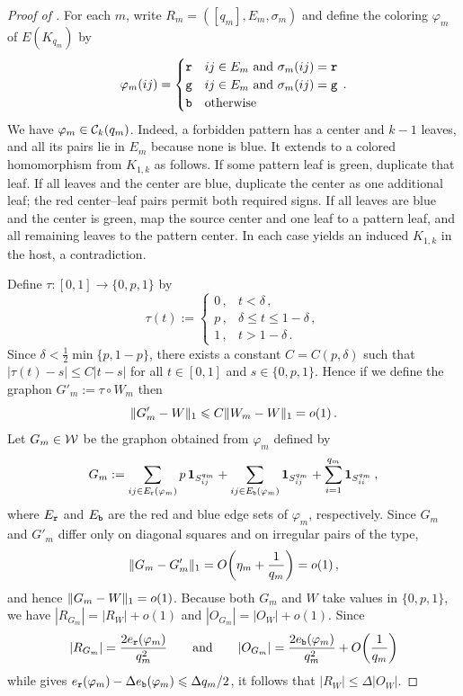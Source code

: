 \begin{proof}[Proof of ]
For each $m$, write $R_m=([q_m],E_m,\sigma_m)$ and define the coloring $\varphi_m$ of $E(K_{q_m})$ by
\begin{equation}\label{eqn:varphim-ij}
\varphi_m(ij)=\begin{cases}{\normalfont\texttt r}&\text{$ij\in E_m$ and $\sigma_m(ij)={\normalfont\texttt r}$}\\{\normalfont\texttt g}&\text{$ij\in E_m$ and $\sigma_m(ij)={\normalfont\texttt g}$}\\{\normalfont\texttt b}&\text{otherwise}\end{cases}\,.
\end{equation}
We have $\varphi_m\in{\mathcal C}_k(q_m)$. Indeed, a forbidden pattern has a center and $k-1$ leaves, and all its pairs lie in $E_m$ because none is blue. It extends to a colored homomorphism from $K_{1,k}$ as follows. If some pattern leaf is green, duplicate that leaf. If all leaves and the center are blue, duplicate the center as one additional leaf; the red center--leaf pairs permit both required signs. If all leaves are blue and the center is green, map the source center and one leaf to a pattern leaf, and all remaining leaves to the pattern center. In each case  yields an induced $K_{1,k}$ in the host, a contradiction.

Define $\tau\colon[0,1]\to\{0,p,1\}$ by
$$\tau(t):=\begin{cases}
0\,,&t<\delta\,,\\
p\,,&\delta\leq t\leq1-\delta\,,\\
1\,,&t>1-\delta\,.
\end{cases}$$
Since $\delta<\frac12\min\{p,1-p\}$, there exists a constant $C=C(p,\delta)$ such that $|\tau(t)-s|\leq C|t-s|$ for all $t\in[0,1]$ and $s\in\{0,p,1\}$.
Hence if we define the graphon $G'_m:=\tau\circ W_m$ then
$$\lVert G'_m-W\rVert_1\leqslant C\lVert W_m-W\rVert_1=o(1)\,.$$
Let $G_m\in{\mathcal W}$ be the graphon obtained from $\varphi_m$ defined by
$$G_m:=\sum_{ij\in E_{\normalfont\texttt r}(\varphi_m)}p\,\boldsymbol{1}_{S^{q_m}_{ij}}+\sum_{ij\in E_{\normalfont\texttt b}(\varphi_m)}\boldsymbol{1}_{S^{q_m}_{ij}}+\sum_{i=1}^{q_m}\boldsymbol{1}_{S^{q_m}_{ii}}\,,$$
where $E_{\normalfont\texttt r}$ and $E_{\normalfont\texttt b}$ are the red and blue edge sets of $\varphi_m$, respectively. Since $G_m$ and $G'_m$ differ only on diagonal squares and on irregular pairs of the type,
$$\lVert G_m-G'_m\rVert_1=O\!\left(\eta_m+\frac{1}{q_m}\right)=o(1)\,,$$
and hence $\lVert G_m-W\rVert_1=o(1)$. Because both $G_m$ and $W$ take values in $\{0,p,1\}$, we have $|R_{G_m}|=|R_W|+o(1)$ and $|O_{G_m}|=|O_W|+o(1)$. Since
\begin{equation}\label{eqn:RGm-OGm-ana}
|R_{G_m}|=\frac{2e_{\normalfont\texttt r}(\varphi_m)}{q_m^2}\qquad\text{and}\qquad|O_{G_m}|=\frac{2e_{\normalfont\texttt b}(\varphi_m)}{q_m^2}+O\!\left(\frac{1}{q_m}\right)
\end{equation}
while  gives $e_{\normalfont\texttt r}(\varphi_m)-\Delta e_{\normalfont\texttt b}(\varphi_m)\leqslant\Delta q_m/2$, it follows that $|R_W|\leq \Delta|O_W|$.


\end{proof}

